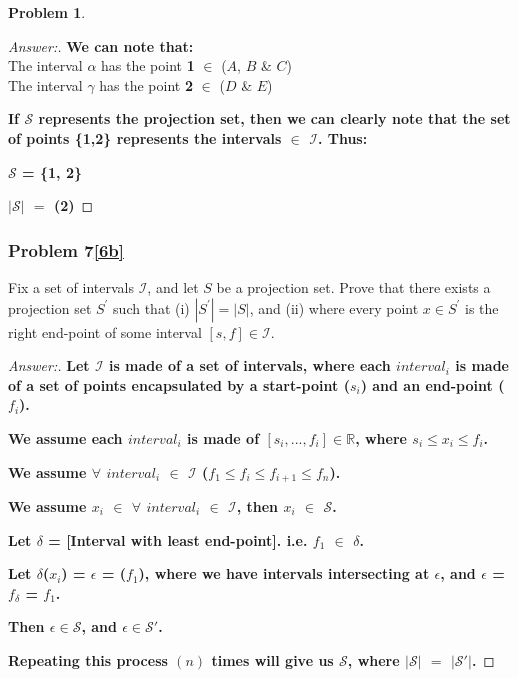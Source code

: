 \documentclass[11pt]{article}
\theoremstyle{definition}
\theoremstyle{definition}
\newtheorem{required}{Problem}
\theoremstyle{definition}
\begin{document}
\begin{required}
\begin{enumerate}[label=(\alph*)]
\begin{proof}[Answer:]
\item \textbf{We can note that:} \\
The interval $\alpha$ has the point \textbf{1} $\in$ ($A$, $B$ \& $C$) \\
The interval $\gamma$ has the point \textbf{2} $\in$ ($D$ \& $E$) \\

\item \textbf{If $\mathcal{S}$ represents the projection set, then we can clearly note that the set of points \{1,2\} represents the intervals $\in$ $\mathcal{I}$. Thus:} \\
\item \textbf{$\mathcal{S}$ = \{1, 2\}}
\item \textbf{$|$$\mathcal{S}$$|$ $=$ (2)}
\end{proof}

\newpage
\subsubsection{Problem 7\ref{6b}}
\item \label{6b} Fix a set of intervals $\mathcal{I}$, and let $S$ be a projection set. Prove that there exists a projection set $S^{\prime}$ such that (i) $|S^{\prime}| = |S|$, and (ii) where every point $x \in S^{\prime}$ is the right end-point of some interval $[s, f] \in \mathcal{I}$. 

\begin{proof}[Answer:]
\item \textbf{Let $\mathcal{I}$ is made of a set of intervals, where each $interval_i$ is made of a set of points encapsulated by a start-point ($s_i$) and an end-point ($f_i$).}
\item \textbf{We assume each $interval_i$ is made of $[s_i,...,f_i]$$\in \mathbb{R}$, where $s_i \leq x_i \leq f_i$.}
\item \textbf{We assume $\forall$ $interval_i$ $\in$ $\mathcal{I}$ ($f_1 \leq f_i \leq f_{i+1} \leq f_n$).}
\item \textbf{We assume $x_i$ $\in$ $\forall$ $interval_i$ $\in$ $\mathcal{I}$, then $x_i$ $\in$ $\mathcal{S}$.}

\item \textbf{Let $\delta$ = [Interval with least end-point]. i.e. $f_1$ $\in$ $\delta$.} 
\item \textbf{Let $\delta$($x_i$) = $\epsilon$ = ($f_1$), where we have intervals intersecting at $\epsilon$, and $\epsilon$ = $f_{\delta}$ = $f_1$.}
\item \textbf{Then $\epsilon \in \mathcal{S}$, and $\epsilon \in \mathcal{S'}$.}
\item \textbf{Repeating this process $(n)$ times will give us $\mathcal{S}$, where $|$$\mathcal{S}$$|$ $=$ $|$$\mathcal{S'}$$|$.}
\end{proof}

\end{enumerate}
\end{required}
 
\end{document}
